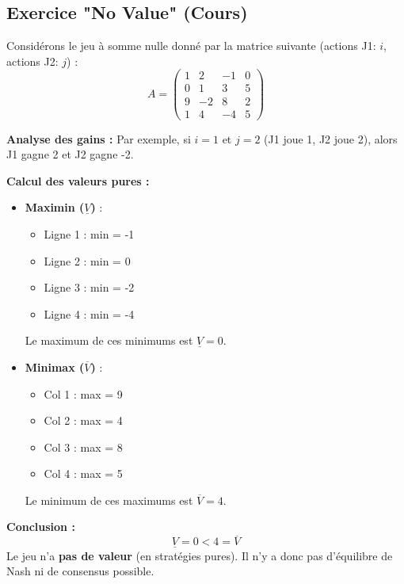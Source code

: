 \subsection{Exercice "No Value" (Cours)}
Considérons le jeu à somme nulle donné par la matrice suivante (actions J1: $i$, actions J2: $j$) :
$$ A = \begin{pmatrix} 1 & 2 & -1 & 0 \\ 0 & 1 & 3 & 5 \\ 9 & -2 & 8 & 2 \\ 1 & 4 & -4 & 5 \end{pmatrix} $$

\textbf{Analyse des gains :}
Par exemple, si $i=1$ et $j=2$ (J1 joue 1, J2 joue 2), alors J1 gagne 2 et J2 gagne -2.

\textbf{Calcul des valeurs pures :}
\begin{itemize}
    \item \textbf{Maximin ($\underline{V}$)} :
    \begin{itemize}
        \item Ligne 1 : min = -1
        \item Ligne 2 : min = 0
        \item Ligne 3 : min = -2
        \item Ligne 4 : min = -4
    \end{itemize}
    Le maximum de ces minimums est $\underline{V} = 0$.

    \item \textbf{Minimax ($\overline{V}$)} :
    \begin{itemize}
        \item Col 1 : max = 9
        \item Col 2 : max = 4
        \item Col 3 : max = 8
        \item Col 4 : max = 5
    \end{itemize}
    Le minimum de ces maximums est $\overline{V} = 4$.
\end{itemize}

\textbf{Conclusion :}
$$ \underline{V} = 0 < 4 = \overline{V} $$
Le jeu n'a \textbf{pas de valeur} (en stratégies pures). Il n'y a donc pas d'équilibre de Nash ni de consensus possible.

